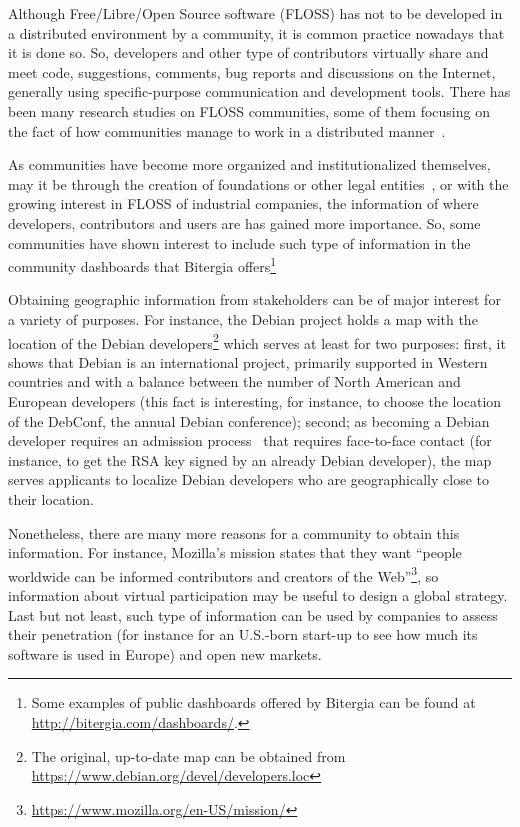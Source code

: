 \documentclass{sig-alternate-05-2015}
\begin{document}
Although Free/Libre/Open Source software (FLOSS) has not to be developed in a
distributed environment by a community, it is common practice nowadays that
it is done so. So, developers and other type of contributors virtually
share and meet code, suggestions, comments, bug reports and discussions
on the Internet, generally using specific-purpose communication and 
development tools. There has been many research studies on FLOSS
communities, some of them focusing on the fact of
how communities manage to work in a distributed manner~\cite{german2003gnome,yu2016effect}.

As communities have become more organized and institutionalized themselves,
may it be through the creation of foundations or other legal entities~\cite{riehle2010economic}, or with the growing interest in FLOSS
of industrial companies, the information of where developers, contributors
and users are has gained more importance. So, some communities have shown
interest to include such type of information in the community dashboards
that Bitergia offers\footnote{Some examples of public dashboards offered by
Bitergia can be found at \url{http://bitergia.com/dashboards/}.}

Obtaining geographic information from stakeholders can be of major interest
for a variety of purposes. For instance, the Debian project holds a map
with the location of the Debian 
developers\footnote{The original, up-to-date
map can be obtained from \url{https://www.debian.org/devel/developers.loc}} %
which serves at least for two purposes: first, it shows that Debian is an international
project, primarily supported in Western countries and with a balance between the
number of North American and European developers (this fact is interesting, for
instance, to choose the location of the DebConf, the annual Debian conference);
second; as becoming a Debian developer requires an admission process~\cite{robles2005evolution} that requires face-to-face contact (for instance,
to get the RSA key signed by an already Debian developer), the map serves
applicants to localize Debian developers who are geographically close to their
location. 


Nonetheless, there are many more reasons for a community to obtain this 
information. For instance, Mozilla's mission states that they want 
``people worldwide can be informed contributors and creators of the 
Web''\footnote{\url{https://www.mozilla.org/en-US/mission/}}, so information
about virtual participation may be useful to design a global strategy.
Last but not least, such type of information can be used by companies to 
assess their penetration (for instance for an U.S.-born start-up to see
how much its software is used in Europe) and open new markets.
\end{document}
